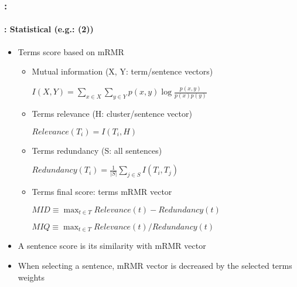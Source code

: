 \documentclass[xcolor=table]{beamer}
\begin{document}
\begin{frame}
	\frametitle{\insertshortsubtitle: \insertsection}
	\framesubtitle{\insertsubsection: Statistical (e.g.: \cite{15-oufaida-al} (2))}

	\begin{itemize}
		\item Terms score based on mRMR
		\begin{itemize}
			\item Mutual information (X, Y: term/sentence vectors) 
			
			\begin{center}
				$I(X, Y) = \sum\limits_{x \in X} \sum\limits_{y \in Y} p(x, y) \log \frac{p(x, y)}{p(x) p(y)}$
			\end{center}
			
			\item Terms relevance (H: cluster/sentence vector)
			\begin{center}
				$Relevance(T_i) = I(T_i, H)$
			\end{center}
			
			\item Terms redundancy (S: all sentences)
			
			\begin{center}
				$Redundancy(T_i) = \frac{1}{|S|} \sum\limits_{j \in S} I(T_i, T_j)$
			\end{center}
			
			\item Terms final score: terms mRMR vector
			
			\begin{center}
				$MID \equiv \max_{t \in T} Relevance(t) - Redundancy(t)$
			
			$MIQ \equiv \max_{t \in T} Relevance(t) / Redundancy(t)$
			\end{center}
		\end{itemize}
		
		\item A sentence score is its similarity with mRMR vector
		
		\item When selecting a sentence, mRMR vector is decreased by the selected terms weights
	\end{itemize}
	
\end{frame}
\end{document}
